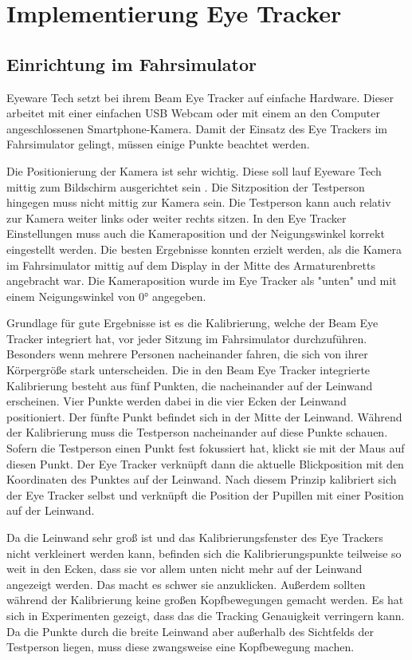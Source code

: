 \chapter{Implementierung Eye Tracker}
\label{sec:implementierung eye tracker}

\section{Einrichtung im Fahrsimulator}

Eyeware Tech setzt bei ihrem Beam Eye Tracker auf einfache Hardware. Dieser arbeitet mit einer einfachen USB Webcam oder mit einem an den Computer angeschlossenen Smartphone-Kamera. Damit der Einsatz des Eye Trackers im Fahrsimulator gelingt, müssen einige Punkte beachtet werden. 

Die Positionierung der Kamera ist sehr wichtig. Diese soll lauf Eyeware Tech mittig zum Bildschirm ausgerichtet sein \cite{lit_software_beam_eyetracker}. Die Sitzposition der Testperson hingegen muss nicht mittig zur Kamera sein. Die Testperson kann auch relativ zur Kamera weiter links oder weiter rechts sitzen.
In den Eye Tracker Einstellungen muss auch die Kameraposition und der Neigungswinkel korrekt eingestellt werden. Die besten Ergebnisse konnten erzielt werden, als die Kamera im Fahrsimulator mittig auf dem Display in der Mitte des Armaturenbretts angebracht war. Die Kameraposition wurde im Eye Tracker als "unten" und mit einem Neigungswinkel von 0° angegeben.

Grundlage für gute Ergebnisse ist es die Kalibrierung, welche der Beam Eye Tracker integriert hat, vor jeder Sitzung im Fahrsimulator durchzuführen. Besonders wenn mehrere Personen nacheinander fahren, die sich von ihrer Körpergröße stark unterscheiden. Die in den Beam Eye Tracker integrierte Kalibrierung besteht aus fünf Punkten, die nacheinander auf der Leinwand erscheinen. Vier Punkte werden dabei in die vier Ecken der Leinwand positioniert. Der fünfte Punkt befindet sich in der Mitte der Leinwand. Während der Kalibrierung muss die Testperson nacheinander auf diese Punkte schauen. Sofern die Testperson einen Punkt fest fokussiert hat, klickt sie mit der Maus auf diesen Punkt. Der Eye Tracker verknüpft dann die aktuelle Blickposition mit den Koordinaten des Punktes auf der Leinwand. Nach diesem Prinzip kalibriert sich der Eye Tracker selbst und verknüpft die Position der Pupillen mit einer Position auf der Leinwand.

Da die Leinwand sehr groß ist und das Kalibrierungsfenster des Eye Trackers nicht verkleinert werden kann, befinden sich die Kalibrierungspunkte teilweise so weit in den Ecken, dass sie vor allem unten nicht mehr auf der Leinwand angezeigt werden. Das macht es schwer sie anzuklicken. Außerdem sollten während der Kalibrierung keine großen Kopfbewegungen gemacht werden. Es hat sich in Experimenten gezeigt, dass das die Tracking Genauigkeit verringern kann. Da die Punkte durch die breite Leinwand aber außerhalb des Sichtfelds der Testperson liegen, muss diese zwangsweise eine Kopfbewegung machen. 

